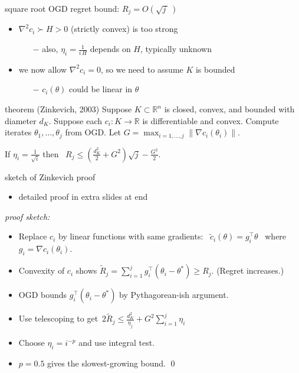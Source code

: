 \documentclass[svgnames,
               hyperref={colorlinks,citecolor=DeepPink4,linkcolor=FireBrick,urlcolor=Maroon},
               usepdftitle=false]  %
               {beamer}
\newcommand{\grad}{\nabla}
\newcommand{\RR}{\mathbb{R}}
\newcommand{\ds}{\displaystyle}
\begin{document}
\begin{frame}{square root OGD regret bound: $R_j = O(\sqrt{j\,}\,)$}

\begin{itemize}
\item $\grad^2 c_i \succ H > 0$ (strictly convex) is too strong
    \begin{itemize}
    \item[$-$] also, $\eta_i = \frac{1}{i\,H}$ depends on $H$, typically unknown
    \end{itemize}
\item we now allow $\grad^2 c_i = 0$, so we need to assume $K$ is bounded
    \begin{itemize}
    \item[$-$] $c_i(\theta)$ could be linear in $\theta$
    \end{itemize}
\end{itemize}

\begin{block}{theorem (Zinkevich, 2003)}
Suppose $K\subset \RR^n$ is closed, convex, and bounded with diameter $d_K$.  Suppose each $c_i:K \to \RR$ is differentiable and convex.  Compute iterates $\theta_1,\dots,\theta_j$ from OGD.  Let $G = \max_{i=1,\dots,j} \|\grad c_i(\theta_i)\|$.

If $\ds \eta_i = \frac{1}{\sqrt{i}}$ then \, $\ds \boxed{R_j \le \left(\frac{d_K^2}{2} + G^2\right) \sqrt{j} - \frac{G^2}{2}.}$
\end{block}
\end{frame}


\begin{frame}{sketch of Zinkevich proof}
\begin{itemize}
\item detailed proof in extra slides at end
\end{itemize}

\bigskip
\noindent \emph{proof sketch:}

\begin{itemize}
\item Replace $c_i$ by linear functions with same gradients: \, $\tilde c_i(\theta) = g_i^\top \theta$ \, where $g_i = \grad c_i(\theta_i)$.
\item Convexity of $c_i$ shows {\small $\ds \tilde R_j = \sum_{i=1}^j g_i^\top (\theta_i - \theta^*) \ge R_j$}.  (Regret increases.)
\item OGD bounds $g_i^\top (\theta_i - \theta^*)$ by Pythagorean-ish argument.
\item Use telescoping to get\, $\ds 2 \tilde R_j \le \frac{d_K^2}{\eta_j} + G^2 \sum_{i=1}^j \eta_i$
\item Choose $\eta_i = i^{-p}$ and use integral test.
\item $p=0.5$ gives the slowest-growing bound. \hfill \qed
\end{itemize}
\end{frame}
\end{document}

